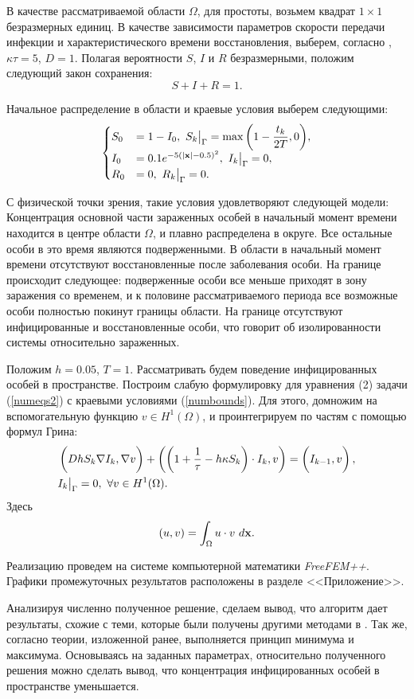 	В качестве рассматриваемой области $\Omega$, для простоты, возьмем квадрат $1 \times 1$ безразмерных единиц. В качестве зависимости параметров скорости передачи инфекции и характеристического времени восстановления, выберем, согласно \cite{lit23}, $\kappa \tau = 5$, $D = 1$. Полагая вероятности $S$, $I$ и $R$ безразмерными, положим следующий закон сохранения:
	\[ S + I + R = 1. \]

	Начальное распределение в области и краевые условия выберем следующими:
	\begin{equation}
		\label{numbounds}
		\begin{cases} 
			S_0 &= 1-I_0 , ~ S_k\bigl. \bigr\vert_{\Gamma} = \max{\left( 1-\dfrac{t_k}{2T}, 0 \right)}, \\
			I_0 &= 0.1 e^{-5\left( \left\vert \mathbf{x} \right\vert-0.5 \right)^2}, ~ I_k\bigl. \bigr\vert_{\Gamma} = 0, \\
			R_0 &= 0, ~ R_k\bigl. \bigr\vert_{\Gamma} = 0.
		\end{cases}
	\end{equation}

	С физической точки зрения, такие условия удовлетворяют следующей модели: Концентрация основной части зараженных особей в начальный момент времени находится в центре области $\Omega$, и плавно распределена в округе. Все остальные особи в это время являются подверженными. В области в начальный момент времени отсутствуют восстановленные после заболевания особи. На границе происходит следующее: подверженные особи все меньше приходят в зону заражения со временем, и к половине рассматриваемого периода все возможные особи полностью покинут границы области. На границе отсутствуют инфицированные и восстановленные особи, что говорит об изолированности системы относительно зараженных.

	Положим $h = 0.05$, $T = 1$. Рассматривать будем поведение инфицированных особей в пространстве. Построим слабую формулировку для уравнения (2) задачи (\ref{numeqs2}) с краевыми условиями (\ref{numbounds}). Для этого, домножим на вспомогательную функцию $v \in H^1(\Omega)$, и проинтегрируем по частям с помощью формул Грина:
	\begin{equation}
		\label{numweakform}
		\begin{split}
			&\pares{ \vphantom{\frac{1}{\tau}} D h S_k \grad{I_k}, \grad{v} } + \pares{ \pares{1 + \frac{1}{\tau} - h \kappa S_k} \cdot I_k, v} = \pares{\vphantom{\frac{1}{\tau}} I_{k-1}, v}, \\
			& I_k \ont_{\Gamma} = 0, ~ \forall{v} \in H^1(\Omega).
		\end{split}
	\end{equation}
	Здесь
	\[ \left( u, v \right) = \int_{\Omega} u \cdot v ~ d\mathbf{x}. \]

	Реализацию проведем на системе компьютерной математики \textit{FreeFEM++}. Графики промежуточных результатов расположены в разделе <<Приложение>>.

	Анализируя численно полученное решение, сделаем вывод, что алгоритм дает результаты, схожие с теми, которые были получены другими методами в \cite{lit22,lit23}. Так же, согласно теории, изложенной ранее, выполняется принцип минимума и максимума. Основываясь на заданных параметрах, относительно полученного решения можно сделать вывод, что концентрация инфицированных особей в пространстве уменьшается.